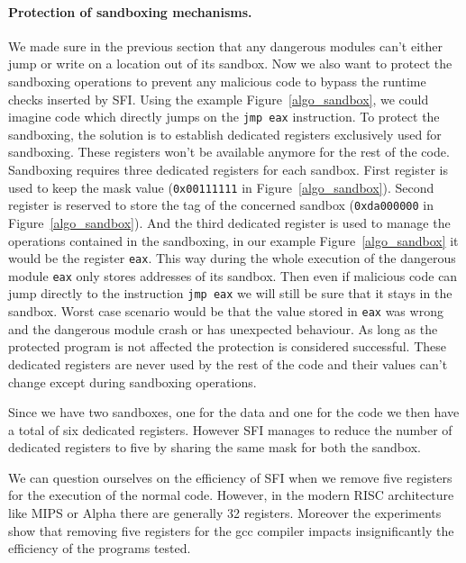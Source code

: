 \documentclass[11pt]{sdm}
\begin{document}
\paragraph{Protection of sandboxing mechanisms.}
\label{par:Protection of sandboxing mechanisms}
We made sure in the previous section that any dangerous modules can't either jump or write on a location out of its sandbox. Now we also want to protect the sandboxing operations to prevent any malicious code to bypass the runtime checks inserted by SFI. Using the example Figure~\ref{algo_sandbox}, we could imagine code which directly jumps on the \texttt{jmp eax} instruction. To protect the sandboxing, the solution is to establish dedicated registers exclusively used for sandboxing. These registers won't be available anymore for the rest of the code. Sandboxing requires three dedicated registers for each sandbox. First register is used to keep the mask value (\texttt{0x00111111} in Figure~\ref{algo_sandbox}). Second register is reserved to store the tag of the concerned sandbox (\texttt{0xda000000} in Figure~\ref{algo_sandbox}). And the third dedicated register is used to manage the operations contained in the sandboxing, in our example Figure~\ref{algo_sandbox} it would be the register \texttt{eax}. This way during the whole execution of the dangerous module \texttt{eax} only stores addresses of its sandbox. Then even if malicious code can jump directly to the instruction \texttt{jmp eax} we will still be sure that it stays in the sandbox. 
Worst case scenario would be that the value stored in \texttt{eax} was wrong and the dangerous module crash or has unexpected behaviour. As long as the protected program is not affected the protection is considered successful.
These dedicated registers are never used by the rest of the code and their values can't change except during sandboxing operations.

Since we have two sandboxes, one for the data and one for the code we then have a total of six dedicated registers. However SFI manages to reduce the number of dedicated registers to five by sharing the same mask for both the sandbox.

We can question ourselves on the efficiency of SFI when we remove five registers for the execution of the normal code. However, in the modern RISC architecture like MIPS or Alpha there are generally 32 registers. Moreover the experiments~\cite{Wahbe:1993:ESF:173668.168635} show that removing five registers for the gcc compiler impacts insignificantly the efficiency of the programs tested.
\end{document}
